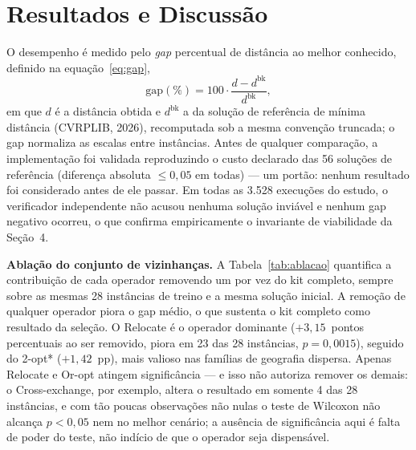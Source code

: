 \documentclass[10pt,a4paper]{article}
\begin{document}
\section{Resultados e Discussão}
O desempenho é medido pelo \emph{gap} percentual de distância ao melhor conhecido, definido na equação~\eqref{eq:gap},
\begin{equation}
\mathrm{gap}(\%)=100\cdot\frac{d-d^{\mathrm{bk}}}{d^{\mathrm{bk}}},
\label{eq:gap}
\end{equation}
em que $d$ é a distância obtida e $d^{\mathrm{bk}}$ a da solução de referência de mínima distância (CVRPLIB, 2026), recomputada sob a mesma convenção truncada; o gap normaliza as escalas entre instâncias. Antes de qualquer comparação, a implementação foi validada reproduzindo o custo declarado das 56 soluções de referência (diferença absoluta $\le 0{,}05$ em todas) --- um portão: nenhum resultado foi considerado antes de ele passar. Em todas as 3.528 execuções do estudo, o verificador independente não acusou nenhuma solução inviável e nenhum gap negativo ocorreu, o que confirma empiricamente o invariante de viabilidade da Seção~4.

\vspace{\baselineskip}
\textbf{Ablação do conjunto de vizinhanças.} A Tabela~\ref{tab:ablacao} quantifica a contribuição de cada operador removendo um por vez do kit completo, sempre sobre as mesmas 28 instâncias de treino e a mesma solução inicial. A remoção de qualquer operador piora o gap médio, o que sustenta o kit completo como resultado da seleção. O Relocate é o operador dominante ($+3{,}15$~pontos percentuais ao ser removido, piora em 23 das 28 instâncias, $p=0{,}0015$), seguido do 2-opt* ($+1{,}42$~pp), mais valioso nas famílias de geografia dispersa. Apenas Relocate e Or-opt atingem significância --- e isso não autoriza remover os demais: o Cross-exchange, por exemplo, altera o resultado em somente 4 das 28 instâncias, e com tão poucas observações não nulas o teste de Wilcoxon não alcança $p<0{,}05$ nem no melhor cenário; a ausência de significância aqui é falta de poder do teste, não indício de que o operador seja dispensável.


\end{document}
